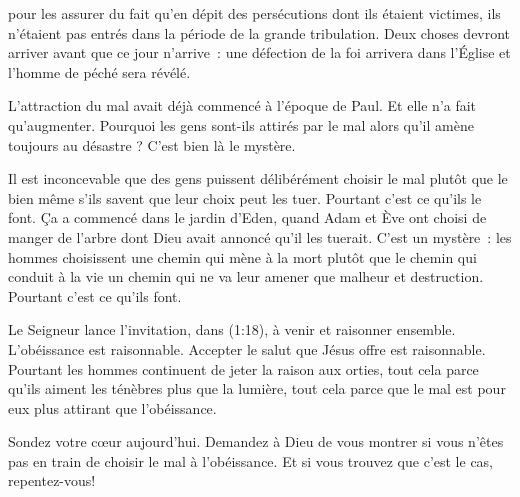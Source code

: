 



 pour les assurer du fait
 qu'en dépit des persécutions dont ils étaient victimes,
 ils n'étaient pas entrés dans la période de la grande tribulation.
 Deux choses devront arriver avant que ce jour n'arrive~:
 une défection de la foi arrivera dans l'Église 
 et l'homme de péché sera révélé.

L'attraction du mal avait déjà commencé à l'époque de Paul.
 Et elle n'a fait qu'augmenter. Pourquoi 
 les gens sont-ils attirés
 par le mal alors qu'il amène toujours au désastre ?
 C'est bien là le mystère.


Il est inconcevable que des gens puissent délibérément choisir le mal
 plutôt que le bien \ocadr même s'ils savent que leur choix peut les tuer.
 Pourtant c'est ce qu'ils le font.
 Ça a commencé dans le jardin d'Eden, quand Adam et Ève ont choisi de manger
 de l'arbre dont Dieu avait annoncé qu'il les tuerait.
 C'est un mystère~: les hommes choisissent une chemin qui mène à la mort
 plutôt que le chemin qui conduit à la vie
 \ocadr un chemin qui ne va leur amener que malheur et destruction.
 Pourtant c'est ce qu'ils font.

Le Seigneur lance l'invitation, dans (1:18),
 à \og venir et raisonner ensemble. \fg{} L'obéissance est raisonnable.
 Accepter le salut que Jésus offre est raisonnable.
 Pourtant les hommes continuent  de jeter la raison aux orties,
 tout cela parce qu'ils aiment les ténèbres plus que la lumière,
 tout cela parce que le mal est pour eux plus attirant que l'obéissance.

Sondez votre cœur aujourd'hui. Demandez à Dieu de vous montrer
 si vous n'êtes pas en train de choisir le mal à l'obéissance.
 Et si vous trouvez que c'est le cas, repentez-vous!

\dvrule



